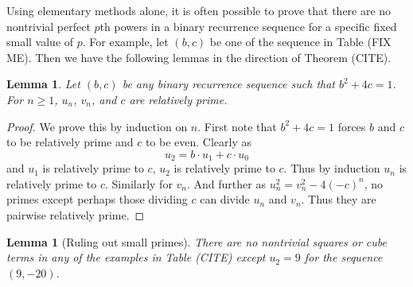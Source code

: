 \documentclass[12pt]{amsart}
\newtheorem{lem}[thm]{Lemma}
\theoremstyle{definition}
\begin{document}
Using elementary methods alone, it is often possible to prove that there are no nontrivial perfect $p$th powers in a binary recurrence sequence for a specific fixed small value of $p$.  For example, let $(b,c)$ be one of the sequence in Table (FIX ME).  Then we have the following lemmas in the direction of Theorem (CITE).

\begin{lem}\label{relprime}
Let $(b,c)$ be any binary recurrence sequence such that $b^2+4c=1$.  For $n \geq 1$,  $u_n$, $v_n$, and $c$ are relatively prime.
\end{lem}

\begin{proof}
We prove this by induction on $n$.  First note that $b^2 +4c = 1$ forces $b$ and $c$ to be relatively prime and $c$ to be even.  Clearly as
\[ u_2 = b \cdot u_1 + c \cdot u_0 \]
and $u_1$ is relatively prime to $c$, $u_2$ is relatively prime to $c$.  Thus by induction $u_n$ is relatively prime to $c$.  Similarly for $v_n$.  And further as $u_n^2  = v_n^2 - 4(-c)^n$, no primes except perhaps those dividing $c$ can divide $u_n$ and $v_n$.  Thus they are pairwise relatively prime.
\end{proof}

\begin{lem}[Ruling out small primes]\label{smallp}
There are no nontrivial squares or cube terms in any of the examples in Table (CITE) except $u_2 = 9$ for the sequence $(9,-20)$.
\end{lem}
\end{document}
